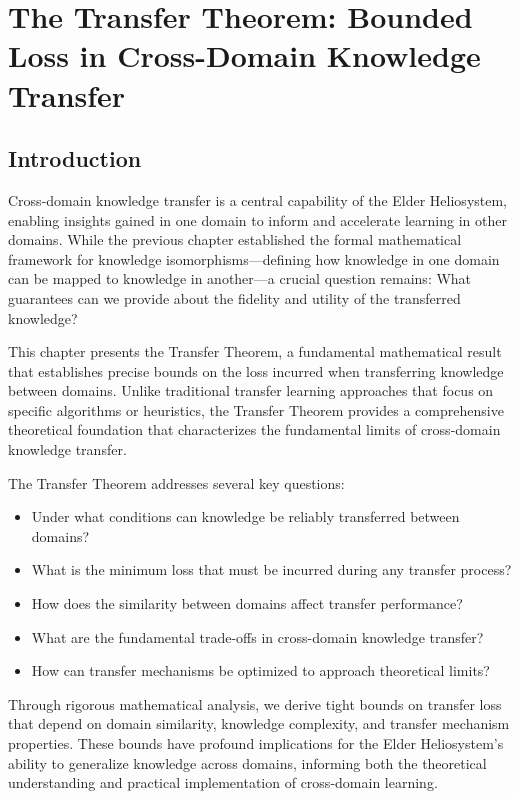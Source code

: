 \chapter{The Transfer Theorem: Bounded Loss in Cross-Domain Knowledge Transfer}

\section{Introduction}

Cross-domain knowledge transfer is a central capability of the Elder Heliosystem, enabling insights gained in one domain to inform and accelerate learning in other domains. While the previous chapter established the formal mathematical framework for knowledge isomorphisms—defining how knowledge in one domain can be mapped to knowledge in another—a crucial question remains: What guarantees can we provide about the fidelity and utility of the transferred knowledge?

This chapter presents the Transfer Theorem, a fundamental mathematical result that establishes precise bounds on the loss incurred when transferring knowledge between domains. Unlike traditional transfer learning approaches that focus on specific algorithms or heuristics, the Transfer Theorem provides a comprehensive theoretical foundation that characterizes the fundamental limits of cross-domain knowledge transfer.

The Transfer Theorem addresses several key questions:
\begin{itemize}
    \item Under what conditions can knowledge be reliably transferred between domains?
    \item What is the minimum loss that must be incurred during any transfer process?
    \item How does the similarity between domains affect transfer performance?
    \item What are the fundamental trade-offs in cross-domain knowledge transfer?
    \item How can transfer mechanisms be optimized to approach theoretical limits?
\end{itemize}

Through rigorous mathematical analysis, we derive tight bounds on transfer loss that depend on domain similarity, knowledge complexity, and transfer mechanism properties. These bounds have profound implications for the Elder Heliosystem's ability to generalize knowledge across domains, informing both the theoretical understanding and practical implementation of cross-domain learning.

